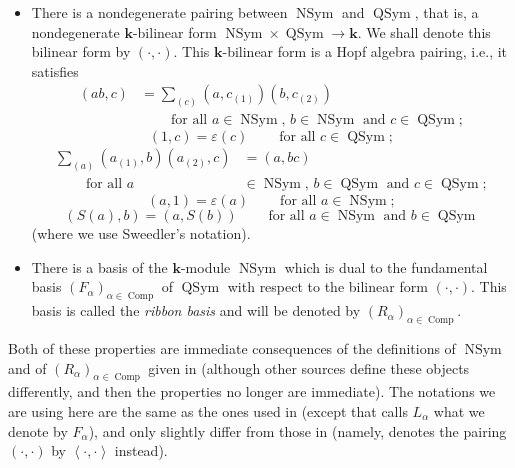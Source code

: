 \documentclass
[numbers=enddot,12pt,final,onecolumn,notitlepage,abstracton]{scrartcl}%
\theoremstyle{definition}
\let\sumnonlimits\sum
\renewcommand{\sum}{\sumnonlimits\limits}
\begin{document}
\begin{itemize}
\item There is a nondegenerate pairing between $\operatorname*{NSym}$ and
$\operatorname*{QSym}$, that is, a nondegenerate $\mathbf{k}$-bilinear form
$\operatorname*{NSym}\times\operatorname*{QSym}\rightarrow\mathbf{k}$. We
shall denote this bilinear form by $\left(  \cdot,\cdot\right)  $. This
$\mathbf{k}$-bilinear form is a Hopf algebra pairing, i.e., it satisfies%
\begin{align}
\left(  ab,c\right)   &  =\sum_{\left(  c\right)  }\left(  a,c_{\left(
1\right)  }\right)  \left(  b,c_{\left(  2\right)  }\right)  \label{eq.(ab,c)}%
\\
&  \ \ \ \ \ \ \ \ \ \ \text{for all }a\in\operatorname*{NSym}\text{, }%
b\in\operatorname*{NSym}\text{ and }c\in\operatorname*{QSym};\nonumber
\end{align}%
\[
\left(  1,c\right)  =\varepsilon\left(  c\right)
\ \ \ \ \ \ \ \ \ \ \text{for all }c\in\operatorname*{QSym};
\]%
\begin{align*}
\sum_{\left(  a\right)  }\left(  a_{\left(  1\right)  },b\right)  \left(
a_{\left(  2\right)  },c\right)   &  =\left(  a,bc\right) \\
\ \ \ \ \ \ \ \ \ \ \text{for all }a  &  \in\operatorname*{NSym}\text{, }%
b\in\operatorname*{QSym}\text{ and }c\in\operatorname*{QSym};
\end{align*}%
\[
\left(  a,1\right)  =\varepsilon\left(  a\right)
\ \ \ \ \ \ \ \ \ \ \text{for all }a\in\operatorname*{NSym};
\]%
\[
\left(  S\left(  a\right)  ,b\right)  =\left(  a,S\left(  b\right)  \right)
\ \ \ \ \ \ \ \ \ \ \text{for all }a\in\operatorname*{NSym}\text{ and }%
b\in\operatorname*{QSym}%
\]
(where we use Sweedler's notation).

\item There is a basis of the $\mathbf{k}$-module $\operatorname*{NSym}$ which
is dual to the fundamental basis $\left(  F_{\alpha}\right)  _{\alpha
\in\operatorname*{Comp}}$ of $\operatorname*{QSym}$ with respect to the
bilinear form $\left(  \cdot,\cdot\right)  $. This basis is called the
\textit{ribbon basis} and will be denoted by $\left(  R_{\alpha}\right)
_{\alpha\in\operatorname*{Comp}}$.
\end{itemize}

Both of these properties are immediate consequences of the definitions of
$\operatorname*{NSym}$ and of $\left(  R_{\alpha}\right)  _{\alpha
\in\operatorname*{Comp}}$ given in \cite[Section 5.4]{Reiner} (although other
sources define these objects differently, and then the properties no longer
are immediate). The notations we are using here are the same as the ones used
in \cite[Section 5.4]{Reiner} (except that \cite[Section 5.4]{Reiner} calls
$L_{\alpha}$ what we denote by $F_{\alpha}$), and only slightly differ from
those in \cite{BBSSZ} (namely, \cite{BBSSZ} denotes the pairing $\left(
\cdot,\cdot\right)  $ by $\left\langle \cdot,\cdot\right\rangle $ instead).
\end{document}
